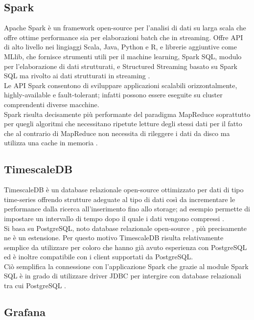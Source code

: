 \subsection{Spark}

Apache Spark è un framework open-source per l'analisi di dati su larga scala che offre ottime
performance sia per elaborazioni batch che in streaming. Offre API di alto livello nei lingiaggi
Scala, Java, Python e R, e librerie aggiuntive come MLlib, che fornisce strumenti utili per il
machine learning, Spark SQL, modulo per l'elaborazione di dati strutturati,
e Structured Streaming basato su Spark SQL ma rivolto ai dati strutturati in streaming \cite{spark}.
\\
Le API Spark consentono di sviluppare applicazioni scalabili orizzontalmente, highly-available
e fault-tolerant; infatti possono
essere eseguite su cluster comprendenti diverse macchine.
\\
Spark risulta decisamente più performante del paradigma MapReduce soprattutto per quegli algoritmi
che necessitano ripetute letture degli stessi dati per il fatto che al contrario di MapReduce non
necessita di rileggere i dati da disco ma utilizza una cache in memoria \cite{spark_mapred}.

\subsection{TimescaleDB}

TimescaleDB è un database relazionale open-source ottimizzato per dati di tipo time-series
offrendo strutture adeguate al tipo di dati così da incrementare le performance dalla ricerca
all'inserimento fino allo storage; ad esempio permette di impostare un intervallo di tempo
dopo il quale i dati vengono compressi \cite{timescale}.
\\
Si basa su PostgreSQL, noto database relazionale open-source \cite{postgresql}, più precisamente
ne è un estensione. Per questo motivo TimescaleDB risulta relativamente semplice da utilizzare
per coloro che hanno già avuto esperienza con PostgreSQL ed è inoltre compatibile con i client
supportati da PostgreSQL.
\\
Ciò semplifica la connessione con l'applicazione Spark che grazie al module Spark SQL è in grado
di utilizzare driver JDBC per intergire con database relazionali tra cui PostgreSQL
\cite{spark_sql}.

\subsection{Grafana}

